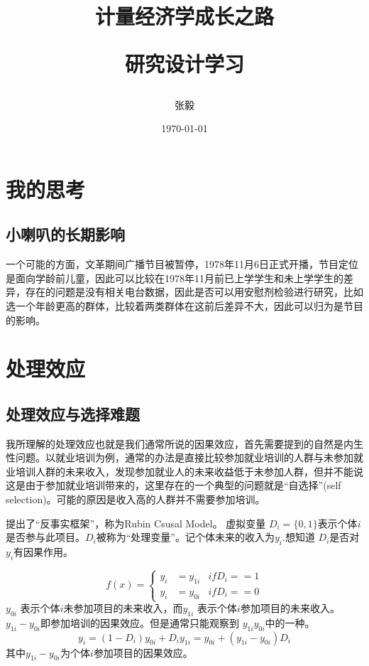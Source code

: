 \documentclass{book}
\title{计量经济学成长之路
\\[2ex]
\begin{large}
研究设计学习
\end{large}}
\author{张毅}
\date{\today}
\begin{document}
\maketitle
\chapter{我的思考}
\section{小喇叭的长期影响}
一个可能的方面，文革期间广播节目被暂停，1978年11月6日正式开播，节目定位是面向学龄前儿童，因此可以比较在1978年11月前已上学学生和未上学学生的差异，存在的问题是没有相关电台数据，因此是否可以用安慰剂检验进行研究，比如选一个年龄更高的群体，比较着两类群体在这前后差异不大，因此可以归为是节目的影响。


\chapter{处理效应}
\section{处理效应与选择难题}
我所理解的处理效应也就是我们通常所说的因果效应，首先需要提到的自然是内生性问题。以就业培训为例，通常的办法是直接比较参加就业培训的人群与未参加就业培训人群的未来收入，发现参加就业人的未来收益低于未参加人群，但并不能说这是由于参加就业培训带来的，这里存在的一个典型的问题就是“自选择”(self selection)。可能的原因是收入高的人群并不需要参加培训。
\par \citet{Rubin1974}提出了“反事实框架”，称为Rubin Csusal Model。 虚拟变量
$D_{i}=\{0,1\}$表示个体$i$是否参与此项目。$D_{i}$被称为“处理变量”。记个体未来的收入为$y_i$.想知道 $D_i$是否对 $y_i$有因果作用。
\par 
\begin{equation}
	 f(x)=\left\{
		\begin{aligned}
		y_i & =y_{1i} & if D_i==1\\
		y_i & =y_{0i} & if D_i==0
		\end{aligned}
		\right.
\end{equation}
$y_{0i} $ 表示个体$i$未参加项目的未来收入，而$y_{1i} $ 表示个体$i$参加项目的未来收入。$y_{1i}-y_{0i}$即参加培训的因果效应。但是通常只能观察到
$y_{1i}  y_{0i} $中的一种。
\begin{equation}
	y_i=(1-D_{i})y_{0i}+D_iy_{1i}=y_{0i}+(y_{1i}-y_{0i})D_i
\end{equation}
其中$y_{1i}-y_{0i}$为个体$i$参加项目的因果效应。
\end{document}
